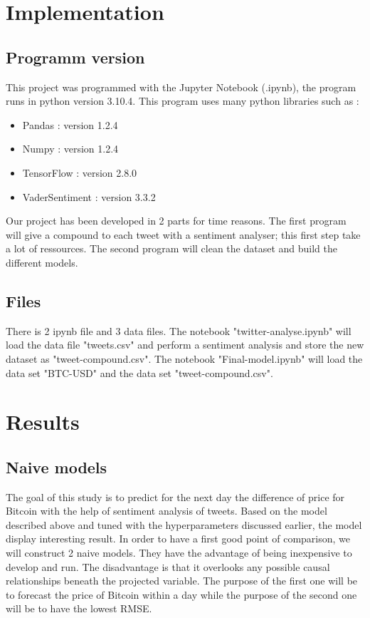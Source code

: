 \documentclass[conference]{IEEEtran}
\begin{document}
\section{Implementation}
\subsection{Programm version}\label{AA}
This project was programmed with the Jupyter Notebook
(.ipynb), the program runs in python version 3.10.4. This
program uses many python libraries such as :\newline
\begin{itemize}
        \item Pandas : version 1.2.4
        \item Numpy : version 1.2.4
        \item TensorFlow  : version 2.8.0
        \item VaderSentiment : version 3.3.2
\end{itemize}
\medskip
Our project has been developed in 2 parts for time reasons. The first program will give a compound to each tweet with a sentiment analyser; this first step take a lot of ressources. The second program will clean the dataset and build the different models.

\subsection{Files}\label{AA}
There is 2 ipynb file and 3 data files. The notebook "twitter-analyse.ipynb" will load the data file "tweets.csv" and perform a sentiment analysis and store the new dataset as "tweet-compound.csv". The notebook "Final-model.ipynb" will load the data set "BTC-USD" and the data set "tweet-compound.csv".


\section{Results}
\subsection{Naive models}\label{AA}
The goal of this study is to predict for the next day the difference of price for Bitcoin with the help of sentiment analysis of tweets. Based on the model described above and tuned with the hyperparameters discussed earlier, the model display interesting result.  
\newline
\newline
In order to have a first good point of comparison, we will construct 2 naive models. They have the advantage of being inexpensive to develop and run. The disadvantage is that it overlooks any possible causal relationships beneath the projected variable.
The purpose of the first one will be to forecast the price of Bitcoin within a day while the purpose of the second one will be to have the lowest RMSE.
\newline
\end{document}
